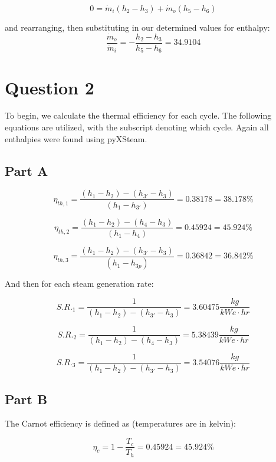 \documentclass{article}
\begin{document}
\begin{equation}
    0 = \Dot{m}_i (h_2 - h_3) + \Dot{m}_o (h_5 - h_6)
\end{equation}

and rearranging, then substituting in our determined values for enthalpy:
\[
    \boxed{\frac{\Dot{m}_o}{\Dot{m}_i} = - \frac{h_2 - h_3}{h_5 - h_6} = 34.9104}
\]

\newpage

\section*{Question 2}

To begin, we calculate the thermal efficiency for each cycle. The following equations are utilized, with the subscript denoting which cycle. Again all enthalpies were found using pyXSteam.

\subsection*{Part A}

\[
    \boxed{\eta_{th,1} = \frac{(h_1 - h_2) - (h_{3'} - h_3)}{(h_1 - h_{3'})} = 0.38178 = 38.178\%}
\]

\[
    \boxed{\eta_{th,2} = \frac{(h_1 - h_2) - (h_{4} - h_3)}{(h_1 - h_{4})} = 0.45924 = 45.924\%}
\]
    
\[
    \boxed{\eta_{th,3} = \frac{(h_1 - h_2) - (h_{3'} - h_3)}{(h_1 - h_{3p})} = 0.36842 = 36.842\%}
\]

And then for each steam generation rate:

\[
\boxed{S.R._1 = \frac{1}{(h_1 - h_2) - (h_{3'} - h_3)} = 3.60475 \frac{kg}{kWe \cdot hr}}
\]

\[
\boxed{S.R._2 = \frac{1}{(h_1 - h_2) - (h_{4} - h_3)} = 5.38439 \frac{kg}{kWe \cdot hr}}
\]

\[
\boxed{S.R._3 = \frac{1}{(h_1 - h_2) - (h_{3'} - h_3)} = 3.54076 \frac{kg}{kWe \cdot hr}}
\]

\subsection*{Part B}
The Carnot efficiency is defined as (temperatures are in kelvin):

\begin{equation}
    \eta_c = 1 - \frac{T_c}{T_h} = 0.45924 = 45.924 \%
\end{equation}
\end{document}
